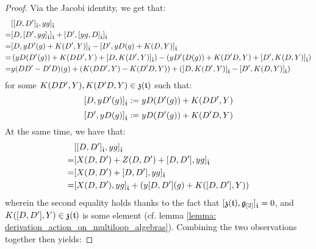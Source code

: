 \begin{proof}
                Via the Jacobi identity, we get that:
                    $$
                        \begin{aligned}
                            & [ [D, D']_{\hat{\mathfrak{t}}}, y g ]_{\hat{\mathfrak{t}}}
                            \\
                            = & [ D, [ D', y g ]_{\hat{\mathfrak{t}}} ]_{\hat{\mathfrak{t}}} + [ D', [ y g, D ]_{\hat{\mathfrak{t}}} ]_{\hat{\mathfrak{t}}}
                            \\
                            = & [ D, y D'( g ) + K(D', Y) ]_{\hat{\mathfrak{t}}} - [ D', y D( g ) + K(D, Y) ]_{\hat{\mathfrak{t}}}
                            \\
                            = & \left( y D( D'(g) ) + K(DD', Y) + [ D, K(D', Y) ]_{\hat{\mathfrak{t}}} \right) - \left( y D'( D(g) ) + K(D'D, Y) + [ D', K(D, Y) ]_{\hat{\mathfrak{t}}} \right)
                            \\
                            = & y (DD' - D'D)( g ) + ( K(DD', Y) - K(D'D, Y) ) + ( [ D, K(D', Y) ]_{\hat{\mathfrak{t}}} - [ D', K(D, Y) ]_{\hat{\mathfrak{t}}} )
                        \end{aligned}
                    $$
                for some $K(DD', Y), K(D'D, Y) \in \mathfrak{z}(\mathfrak{t})$ such that:
                    $$[ D, y D'( g ) ]_{\hat{\mathfrak{t}}} := y D( D'( g ) ) + K(DD', Y)$$
                    $$[ D', y D( g ) ]_{\hat{\mathfrak{t}}} := y D( D'( g ) ) + K(D'D, Y)$$
                At the same time, we have that:
                    $$
                        \begin{aligned}
                            & [ [D, D']_{\hat{\mathfrak{t}}}, y g ]_{\hat{\mathfrak{t}}}
                            \\
                            = & [ X(D, D') + Z(D, D') + [D, D'] , y g ]_{\hat{\mathfrak{t}}}
                            \\
                            = & [ X(D, D') + [D, D'] , y g ]_{\hat{\mathfrak{t}}}
                            \\
                            = & [ X(D, D') , y g ]_{\hat{\mathfrak{t}}} + \left( y [D, D'](g) + K([D, D'], Y) \right)
                        \end{aligned}
                    $$
                wherein the second equality holds thanks to the fact that $[\mathfrak{z}(\mathfrak{t}), \mathfrak{g}_{[2]}]_{\hat{\mathfrak{t}}} = 0$, and $K([D, D'], Y) \in \mathfrak{z}(\mathfrak{t})$ is some element (cf. lemma \ref{lemma: derivation_action_on_multiloop_algebras}). Combining the two observations together then yields:

\end{proof}
